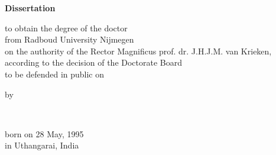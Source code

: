 \begin{titlepage}
    \begin{center}


        \vspace*{2\bigskipamount}

        {\makeatletter
            \titlestyle\bfseries\LARGE\@title
            \makeatother}

        {\makeatletter
            \ifx\@subtitle\undefined\else
                \bigskip
                \titlefont\titleshape\Large\@subtitle
            \fi
            \makeatother}

        \vfill


        {\Large\titlefont\bfseries Dissertation}

        \bigskip
        \bigskip

        to obtain the degree of the doctor\\
        from Radboud University Nijmegen\\
        on the authority of the Rector Magnificus prof. dr. J.H.J.M. van Krieken,\\
        according to the decision of the Doctorate Board\\
        to be defended in public on\\


        \bigskip
        \bigskip

        by

        \bigskip
        \bigskip

        \makeatletter
        {\Large\titlefont\bfseries\@firstnames\ \MakeUppercase{\titleshape\@lastname}}
        \makeatother

        \bigskip
        \bigskip

        born on 28 May, 1995\\
        in Uthangarai, India\\

        \vspace*{2\bigskipamount}

    \end{center}
    \clearpage

    \thispagestyle{empty}


\end{titlepage}
